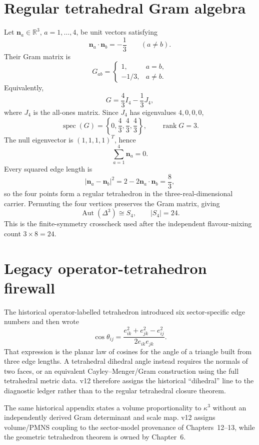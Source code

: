 \section{Regular tetrahedral Gram algebra}

Let \(\mathbf n_a\in\mathbb R^3\), \(a=1,\ldots,4\), be unit vectors satisfying
\[
\mathbf n_a\cdot\mathbf n_b=-\frac13\qquad(a\ne b).
\]
Their Gram matrix is
\[
G_{ab}=
\begin{cases}
1,&a=b,\\
-1/3,&a\ne b.
\end{cases}
\]
Equivalently,
\[
G=\frac43I_4-\frac13J_4,
\]
where \(J_4\) is the all-ones matrix.  Since \(J_4\) has eigenvalues \(4,0,0,0\),
\[
\operatorname{spec}(G)=\left\{0,\frac43,\frac43,\frac43\right\},
\qquad
\operatorname{rank}G=3.
\]
The null eigenvector is \((1,1,1,1)^T\), hence
\[
\sum_{a=1}^4\mathbf n_a=0.
\]
Every squared edge length is
\[
|\mathbf n_a-\mathbf n_b|^2
=2-2\mathbf n_a\cdot\mathbf n_b
=\frac83,
\]
so the four points form a regular tetrahedron in the three-real-dimensional
carrier.  Permuting the four vertices preserves the Gram matrix, giving
\[
\operatorname{Aut}(\Delta^3)\cong S_4,
\qquad |S_4|=24.
\]
This is the finite-symmetry crosscheck used after the independent
flavour-mixing count \(3\times8=24\).

\section{Legacy operator-tetrahedron firewall}

The historical operator-labelled tetrahedron introduced six sector-specific
edge numbers and then wrote
\[
\cos\theta_{ij}
=
\frac{e_{ik}^2+e_{jk}^2-e_{ij}^2}{2e_{ik}e_{jk}}.
\]
That expression is the planar law of cosines for the angle of a triangle built
from three edge lengths.  A tetrahedral dihedral angle instead requires the
normals of two faces, or an equivalent Cayley--Menger/Gram construction using
the full tetrahedral metric data.  v12 therefore assigns the historical
``dihedral'' line to the diagnostic ledger rather than to the regular
tetrahedral closure theorem.

The same historical appendix states a volume proportionality to \(\kappa^3\)
without an independently derived Gram determinant and scale map.  v12 assigns
volume/PMNS coupling to the sector-model provenance of Chapters~12--13, while
the geometric tetrahedron theorem is owned by Chapter~6.

